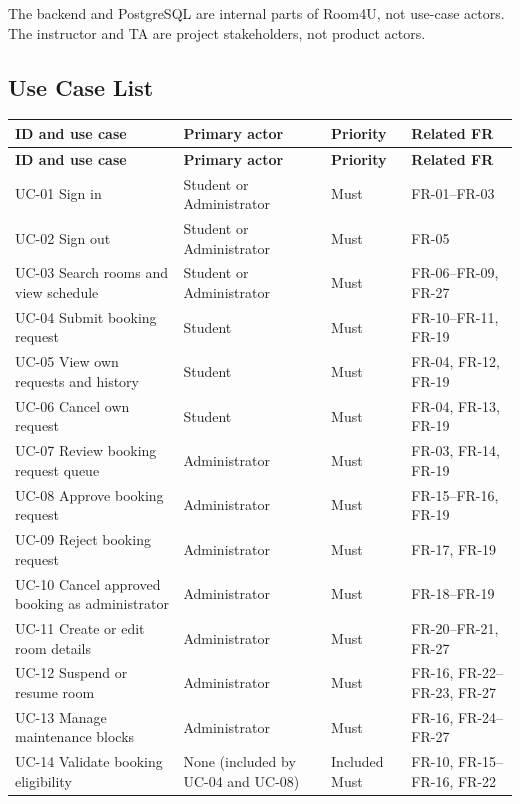 The backend and PostgreSQL are internal parts of Room4U, not use-case actors. The instructor and TA are project stakeholders, not product actors.

\subsection{Use Case List}
\begingroup
\small
{}
\setlength{\tabcolsep}{3pt}
\renewcommand{\arraystretch}{1.1}
\begin{longtable}{|>{\raggedright\arraybackslash}p{}|>{\raggedright\arraybackslash}p{}|>{\raggedright\arraybackslash}p{}|>{\raggedright\arraybackslash}p{}|}
\hline
\textbf{ID and use case} & \textbf{Primary actor} & \textbf{Priority} & \textbf{Related FR} \\ \hline
\endfirsthead
\hline
\textbf{ID and use case} & \textbf{Primary actor} & \textbf{Priority} & \textbf{Related FR} \\ \hline
\endhead
\hline
\endfoot
\hline
\endlastfoot
UC-01 Sign in & Student or Administrator & Must & FR-01--FR-03 \\ \hline
UC-02 Sign out & Student or Administrator & Must & FR-05 \\ \hline
UC-03 Search rooms and view schedule & Student or Administrator & Must & FR-06--FR-09, FR-27 \\ \hline
UC-04 Submit booking request & Student & Must & FR-10--FR-11, FR-19 \\ \hline
UC-05 View own requests and history & Student & Must & FR-04, FR-12, FR-19 \\ \hline
UC-06 Cancel own request & Student & Must & FR-04, FR-13, FR-19 \\ \hline
UC-07 Review booking request queue & Administrator & Must & FR-03, FR-14, FR-19 \\ \hline
UC-08 Approve booking request & Administrator & Must & FR-15--FR-16, FR-19 \\ \hline
UC-09 Reject booking request & Administrator & Must & FR-17, FR-19 \\ \hline
UC-10 Cancel approved booking as administrator & Administrator & Must & FR-18--FR-19 \\ \hline
UC-11 Create or edit room details & Administrator & Must & FR-20--FR-21, FR-27 \\ \hline
UC-12 Suspend or resume room & Administrator & Must & FR-16, FR-22--FR-23, FR-27 \\ \hline
UC-13 Manage maintenance blocks & Administrator & Must & FR-16, FR-24--FR-27 \\ \hline
UC-14 Validate booking eligibility & None (included by UC-04 and UC-08) & Included Must & FR-10, FR-15--FR-16, FR-22 \\ \hline
\end{longtable}
\endgroup

\clearpage
